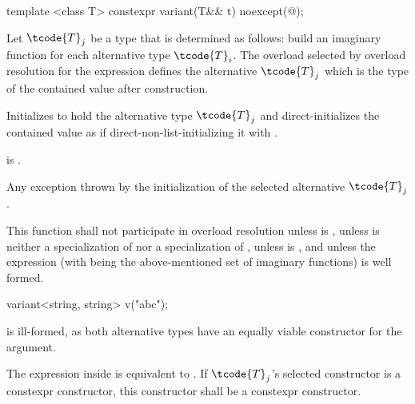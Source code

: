 %
\begin{itemdecl}
template <class T> constexpr variant(T&& t) noexcept(@\seebelow@);
\end{itemdecl}

\begin{itemdescr}
\pnum
Let $\tcode{T}_j$ be a type that is determined as follows:
build an imaginary function  for each alternative type $\tcode{T}_i$. The overload  selected by overload
resolution for the expression  defines
the alternative $\tcode{T}_j$ which is the type of the contained value after
construction.

\pnum
\effects
Initializes  to hold the alternative type $\tcode{T}_j$ and
direct-initializes the contained value as if direct-non-list-initializing it
with .

\pnum
\postconditions
{} is .

\pnum
\throws
Any exception thrown by the initialization of the selected alternative $\tcode{T}_j$.

\pnum
\remarks
This function shall not participate in overload resolution unless
 is ,
unless  is neither
a specialization of 
nor a specialization of ,
unless  is ,
and unless the expression
\brk{} (with 
being the above-mentioned set of imaginary functions) is well formed.

\pnum
\begin{note}
\begin{codeblock}
variant<string, string> v("abc");
\end{codeblock}
is ill-formed, as both alternative types have an equally viable constructor
for the argument. \end{note}

\pnum
The expression inside  is equivalent to
.
If $\tcode{T}_j$'s selected constructor is a constexpr constructor,
this constructor shall be a constexpr constructor.
\end{itemdescr}


